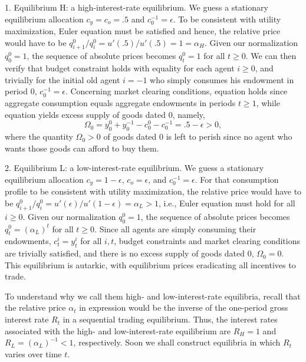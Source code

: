 \medskip
\item{1.}  Equilibrium H: a high-interest-rate
equilibrium.  We guess a stationary equilibrium
allocation $c_y=c_o =.5$ and $c^{-1}_0 = \epsilon$. 
To be consistent with utility maximization, 
Euler equation  must be satisfied
and hence, the relative price would have to be
$q^0_{i+1}/q^0_i = u'(.5)/u'(.5)=1=\alpha_H$. Given our 
normalization $q^0_0=1$, the sequence of absolute 
prices becomes $q_t^0 =1$ for all $t \geq 0$. 
We can then verify that budget constraint 
 holds with equality for each agent 
$i\geq 0$, and trivially for the initial old
agent $i=-1$ who simply consumes his endowment
in period $0$, $c^{-1}_0 =\epsilon$. 
Concerning market clearing conditions,
equation  holds since aggregate
consumption equals aggregate endowments 
in periods $t\geq 1$, while equation 
 yields 
excess supply of goods dated $0$, namely, 
$$ \Omega_0 = y^0_0 + y^{-1}_0 
    - c^0_0 - c^{-1}_0 
= .5 - \epsilon > 0,
$$
where the quantity $\Omega_0>0$ of goods 
dated $0$ is left to perish since no agent
who wants those goods can afford to buy them.


\medskip
\item{2.}  Equilibrium L: a low-interest-rate
equilibrium. We guess a stationary equilibrium
allocation $c_y=1-\epsilon$, $c_o =\epsilon$,
and $c^{-1}_0 = \epsilon$. For that consumption
profile to be consistent with utility maximization,
the relative price would have to be
$q^0_{i+1}/q^0_i = u'(\epsilon)/u'(1-\epsilon)
= \alpha_L > 1$, 
i.e., Euler equation  must hold
for all $i\geq 0$. Given our 
normalization $q^0_0=1$, the sequence of absolute 
prices becomes $q_t^0 = (\alpha_L)^t$ for all 
$t \geq 0$. Since all agents are simply 
consuming their endowments, 
$c^i_t = y_t^i$ for all $i, t$, budget constraints
 and market clearing conditions
 are trivially satisfied, and 
there is no excess supply of goods dated $0$,
$\Omega_0=0$. This equilibrium is autarkic,
with equilibrium prices eradicating all incentives 
to trade.


\medskip
\noindent To understand why we call them high- and 
low-interest-rate equilibria, recall that the
relative price $\alpha_t$ in expression
 would be the inverse of the
one-period gross interest rate $R_t$ in a
sequential trading equilibrium. Thus, the
interest rates associated with the high- 
and low-interest-rate equilibrium 
are $R_H=1$ and $R_L=(\alpha_L)^{-1}<1$,
respectively.
Soon we shall construct equilibria in which 
$R_t$ varies over time $t$.



